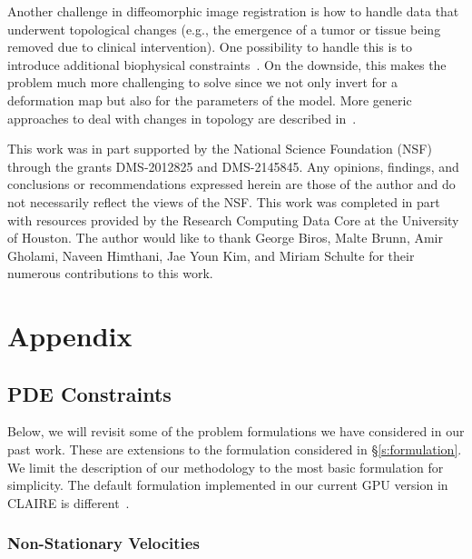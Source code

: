 \documentclass[11pt]{amsart}
\newcommand{\secref}[1]{\S\ref{#1}}
\begin{document}
Another challenge in diffeomorphic image registration is how to handle data that underwent topological changes (e.g., the emergence of a tumor or tissue being removed due to clinical intervention). One possibility to handle this is to introduce additional biophysical constraints~\cite{Gholami:2017a,Gholami:2016a,Scheufele:2020a,Scheufele:2019a,Mang:2017c,Gooya:2012a,Mang:2020a,Hogea:2008a,Zacharaki:2008b,Zacharaki:2009a,Hogea:2008b}. On the downside, this makes the problem much more challenging to solve since we not only invert for a deformation map but also for the parameters of the model. More generic approaches to deal with changes in topology are described in~\cite{Hsieh:2022b,Li:2012a,Franccois:2022a,Antonsanti:2021a,Sukurdeep:2022a}.




 This work was in part supported by the National Science Foundation (NSF) through the grants DMS-2012825 and DMS-2145845. Any opinions, findings, and conclusions or recommendations expressed herein are those of the author and do not necessarily reflect the views of the NSF. This work was completed in part with resources provided by the Research Computing Data Core at the University of Houston. The author would like to thank George Biros, Malte Brunn, Amir Gholami, Naveen Himthani, Jae Youn Kim, and Miriam Schulte for their numerous contributions to this work.




\section*{Appendix}



\subsection*{PDE Constraints}

Below, we will revisit some of the problem formulations we have considered in our past work. These are extensions to the formulation considered in \secref{s:formulation}. We limit the description of our methodology to the most basic formulation for simplicity. The default formulation implemented in our current GPU version in CLAIRE is different~\cite{Brunn:2020a,Brunn:2021a}.




\subsubsection*{Non-Stationary Velocities}
\end{document}
